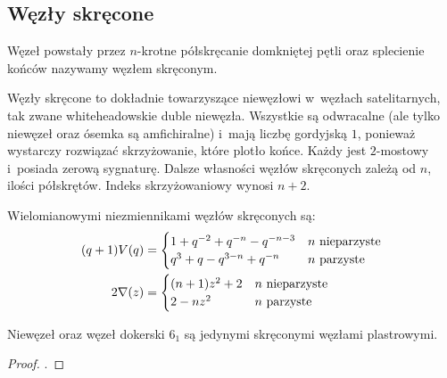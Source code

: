 \subsection{Węzły skręcone}
\begin{definition}
    \label{def:twist_knot}
    Węzeł powstały przez $n$-krotne półskręcanie domkniętej pętli oraz splecienie końców nazywamy węzłem skręconym.
\end{definition}

Węzły skręcone to dokładnie towarzyszące niewęzłowi w~węzłach satelitarnych, tak zwane whiteheadowskie duble niewęzła.
Wszystkie są odwracalne (ale tylko niewęzeł oraz ósemka są amfichiralne) i~mają liczbę gordyjską $1$, ponieważ wystarczy rozwiązać skrzyżowanie, które plotło końce.
Każdy jest $2$-mostowy i~posiada zerową sygnaturę.
Dalsze własności węzłów skręconych zależą od $n$, ilości półskrętów.
Indeks skrzyżowaniowy wynosi $n + 2$.

\begin{proposition}
    Wielomianowymi niezmiennikami węzłów skręconych są:
    \begin{align*}
    (q+1)V(q) & = \begin{cases}
        1+q^{-2}+q^{-n}-q^{-n-3} & n \mbox{ nieparzyste} \\
        q^{3}+q-q^{3-n}+q^{-n} & n \mbox{ parzyste}
    \end{cases} \\
    2 \nabla (z) & = \begin{cases}
        (n+1) z^{2} + 2 & n \mbox{ nieparzyste} \\
        2 - nz^2 & n \mbox{ parzyste}
    \end{cases}
    \end{align*}
\end{proposition}

\begin{proposition}
    Niewęzeł oraz węzeł dokerski $6_1$ są jedynymi skręconymi węzłami plastrowymi.
\end{proposition}

\begin{proof}
    \cite{casson86}.
\end{proof}

